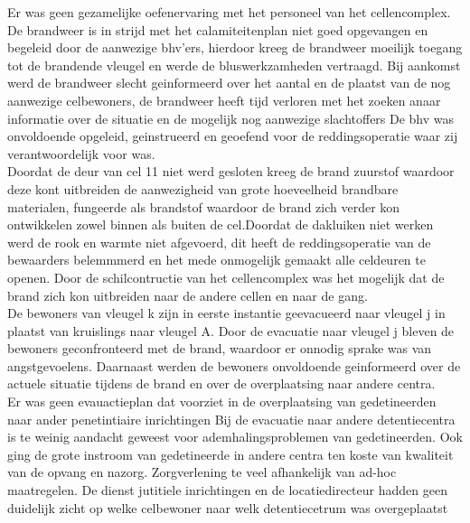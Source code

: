 \documentclass{article}
\begin{document}
	Er was geen gezamelijke oefenervaring met het personeel van het cellencomplex.
	De brandweer is in strijd met het calamiteitenplan niet goed opgevangen en begeleid door de aanwezige bhv'ers, hierdoor kreeg de brandweer moeilijk toegang tot de brandende vleugel en werde de bluswerkzamheden vertraagd.
	Bij aankomst werd de brandweer slecht geinformeerd over het aantal en de plaatst van de nog aanwezige celbewoners, de brandweer heeft tijd verloren met het zoeken anaar informatie over de situatie en de mogelijk nog aanwezige slachtoffers
	De bhv was onvoldoende opgeleid, geinstrueerd en geoefend voor de reddingsoperatie waar zij verantwoordelijk voor was. \\
	Doordat de deur van cel 11 niet werd gesloten kreeg de brand zuurstof waardoor deze kont uitbreiden de aanwezigheid van grote hoeveelheid brandbare materialen, fungeerde als brandstof waardoor de brand zich verder kon ontwikkelen zowel binnen als buiten de cel.Doordat de dakluiken niet  werken werd de rook en warmte niet afgevoerd, dit heeft de reddingsoperatie van de bewaarders belemmmerd en het mede onmogelijk gemaakt alle celdeuren te openen. Door de schilcontructie van het cellencomplex was het mogelijk dat de brand zich kon uitbreiden naar de andere cellen en naar de gang.\\
	De bewoners van vleugel k zijn in eerste instantie geevacueerd naar vleugel j in plaatst van kruislings naar vleugel A.
	Door de evacuatie naar vleugel j bleven de bewoners geconfronteerd met de brand, waardoor er onnodig sprake was van angstgevoelens. Daarnaast werden de bewoners  onvoldoende geinformeerd over de actuele situatie tijdens de brand en over de overplaatsing naar andere centra. \\
	Er was geen evauactieplan dat voorziet in de overplaatsing van gedetineerden naar ander penetintiaire inrichtingen
	Bij de evacuatie naar andere detentiecentra is te weinig aandacht geweest voor ademhalingsproblemen van gedetineerden.
	Ook ging de grote instroom van gedetineerde in andere centra  ten koste van kwaliteit van de opvang en nazorg.
	Zorgverlening te veel afhankelijk van ad-hoc maatregelen.
	De dienst jutitiele inrichtingen en de locatiedirecteur hadden geen duidelijk zicht op welke celbewoner naar welk detentiecetrum was overgeplaatst
\end{document}
